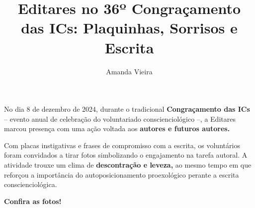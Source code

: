 \documentclass{gescons}
\author{Amanda Vieira}
\title{Editares no 36º Congraçamento das ICs: Plaquinhas, Sorrisos e Escrita}
\begin{document}
    \makeentrevistatitle


    






No dia 8 de dezembro de 2024, durante o tradicional \textbf{Congraçamento das ICs} -- evento anual de celebração do voluntariado conscienciológico --, a Editares marcou presença com uma ação voltada aos \textbf{autores e futuros autores.}

Com placas instigativas e frases de compromisso com a escrita, os voluntários foram convidados a tirar fotos simbolizando o engajamento na tarefa autoral. A atividade trouxe um clima de \textbf{descontração e leveza,} ao mesmo tempo em que reforçou a importância do autoposicionamento proexológico perante a escrita conscienciológica.

\textbf{Confira as fotos!}
\end{document}
